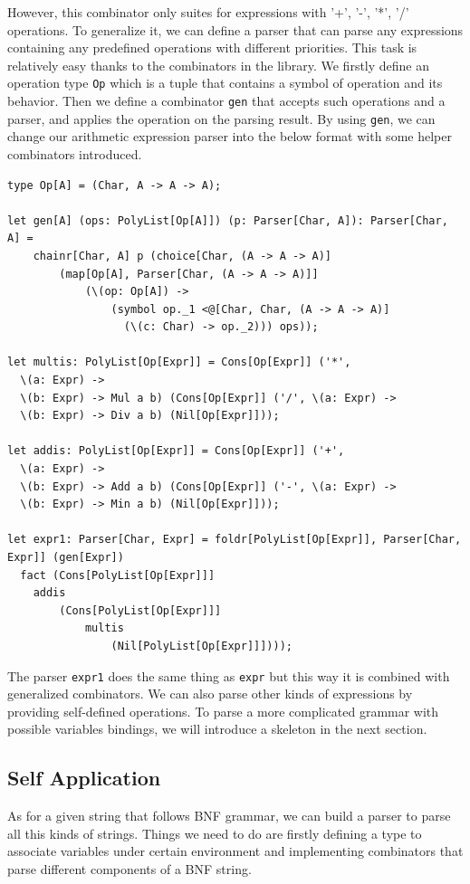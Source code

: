 However, this combinator only suites for expressions with '+', '-', '*', '/' operations. To generalize it, we can define a parser that can parse any expressions containing any predefined operations with different priorities. This task is relatively easy thanks to the combinators in the library. We firstly define an operation type \texttt{Op} which is a tuple that contains a symbol of operation and its behavior. Then we define a combinator \texttt{gen} that accepts such operations and a parser, and applies the operation on the parsing result. By using \texttt{gen}, we can change our arithmetic expression parser into the below format with some helper combinators introduced.

\begin{lstlisting}
type Op[A] = (Char, A -> A -> A);

let gen[A] (ops: PolyList[Op[A]]) (p: Parser[Char, A]): Parser[Char, A] =
    chainr[Char, A] p (choice[Char, (A -> A -> A)]
        (map[Op[A], Parser[Char, (A -> A -> A)]]
            (\(op: Op[A]) ->
                (symbol op._1 <@[Char, Char, (A -> A -> A)]
                  (\(c: Char) -> op._2))) ops));

let multis: PolyList[Op[Expr]] = Cons[Op[Expr]] ('*',
  \(a: Expr) ->
  \(b: Expr) -> Mul a b) (Cons[Op[Expr]] ('/', \(a: Expr) ->
  \(b: Expr) -> Div a b) (Nil[Op[Expr]]));

let addis: PolyList[Op[Expr]] = Cons[Op[Expr]] ('+',
  \(a: Expr) ->
  \(b: Expr) -> Add a b) (Cons[Op[Expr]] ('-', \(a: Expr) ->
  \(b: Expr) -> Min a b) (Nil[Op[Expr]]));

let expr1: Parser[Char, Expr] = foldr[PolyList[Op[Expr]], Parser[Char, Expr]] (gen[Expr])
  fact (Cons[PolyList[Op[Expr]]]
    addis
        (Cons[PolyList[Op[Expr]]]
            multis
                (Nil[PolyList[Op[Expr]]])));
\end{lstlisting}

The parser \texttt{expr1} does the same thing as \texttt{expr} but this way it is combined with generalized combinators. We can also parse other kinds of expressions by providing self-defined operations. To parse a more complicated grammar with possible variables bindings, we will introduce a skeleton in the next section.

\subsection{Self Application}
As for a given string that follows BNF grammar, we can build a parser to parse all this kinds of strings. Things we need to do are firstly defining a type to associate variables under certain environment and implementing combinators that parse different components of a BNF string.

